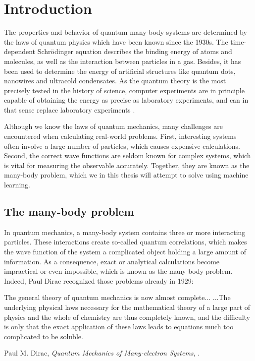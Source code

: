 \chapter{Introduction}
The properties and behavior of quantum many-body systems are determined by the laws of quantum physics which have been known since the 1930s. The time-dependent Schrödinger equation describes the binding energy of atoms and molecules, as well as the interaction between particles in a gas. Besides, it has been used to determine the energy of artificial structures like quantum dots, nanowires and ultracold condensates. As the quantum theory is the most precisely tested in the history of science, computer experiments are in principle capable of obtaining the energy as precise as laboratory experiments, and can in that sense replace laboratory experiments \cite{odom_new_2006}.

Although we know the laws of quantum mechanics, many challenges are encountered when calculating real-world problems. First, interesting systems often involve a large number of particles, which causes expensive calculations. Second, the correct wave functions are seldom known for complex systems, which is vital for measuring the observable accurately. Together, they are known as the many-body problem, which we in this thesis will attempt to solve using machine learning.

\section{The many-body problem}
In quantum mechanics, a many-body system contains three or more interacting particles. These interactions create so-called quantum correlations, which makes the wave function of the system a complicated object holding a large amount of information. As a consequence, exact or analytical calculations become impractical or even impossible, which is known as the many-body problem. Indeed, Paul Dirac recognized those problems already in 1929:

\begin{shadequote}{
		The general theory of quantum mechanics is now almost complete... ...The underlying physical laws necessary for the mathematical theory of a large part of physics and the whole of chemistry are thus completely known, and the difficulty is only that the exact application of these laws leads to equations much too complicated to be soluble. \par Paul M. Dirac, \emph{Quantum Mechanics of Many-electron Systems}, \cite{dirac_paul_adrien_maurice_quantum_1929}.}
\end{shadequote}

